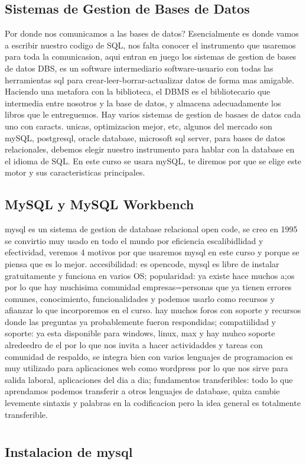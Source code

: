 \documentclass{article}
\theoremstyle{nonumberplain}
\begin{document}
\subsection*{Sistemas de Gestion de Bases de Datos}
Por donde nos comunicamos a las bases de datos? Esencialmente es donde vamos a escribir nuestro codigo de SQL, nos falta conocer el instrumento que usaremos para toda la comunicasion, aqui entran en juego los sistemas de gestion de bases de datos DBS, es un software intermediario software-usuario con todas las herramientas sql para crear-leer-borrar-actualizar datos de forma mas amigable. Haciendo una metafora con la biblioteca, el DBMS es el bibliotecario que intermedia entre nosotros y la base de datos, y almacena adecuadamente los libros que le entreguemos. Hay varios sistemas de gestion de basaes de datos cada uno con caracts. unicas, optimizacion mejor, etc, algunos del mercado son mySQL, postgresql, oracle database, microsoft sql server, para bases de datos relacionales, debemos elegir nuestro instrumento para hablar con la database en el idioma de SQL. En este curso se usara mySQL, te diremos por que se elige este motor y sus caracteristicas principales.

\subsection*{MySQL y MySQL Workbench}
mysql es un sistema de gestion de database relacional open code, se creo en 1995 se convirtio muy usado en todo el mundo por eficiencia escalibidlidad y efectividad, veremos 4 motivos por que usaremos mysql en este curso y porque se piensa que es lo mejor. accesibilidad: es opencode, mysql es libre de instalar gratuitamente y funciona en varios OS; popularidad: ya existe hace muchos a;os por lo que hay muchisima comunidad empresas=personas que ya tienen errores comunes, conocimiento, funcionalidades y podemos usarlo como recursos y afianzar lo que incorporemos en el curso. hay muchos foros con soporte y recursos donde las preguntas ya probablemente fueron respondidas; compatiilidad y soporte: ya esta disponible para windows, linux, max y hay muhco soporte alredeedro de el por lo que nos invita a hacer actividaddes y tareas con comunidad de respaldo, se integra bien con varios lenguajes de programacion es muy utilizado para aplicaciones web como wordpress por lo que nos sirve para salida laboral, aplicaciones del dia a dia; fundamentos transferibles: todo lo que aprendamos podemos transferir a otros lenguajes de database, quiza cambie levemente sintaxis y palabras en la codificacion pero la idea general es totalmente transferible.

\section{}
\subsection*{Instalacion de mysql}
\end{document}
